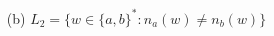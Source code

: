 \documentclass[12pt]{article}
\begin{document}
\begin{spacing}{1.5}
\begin{enumerate}
\begin{enumerate}
                        \item[(b)] $L_2=\{w \in \{a,b \}^* : n_a(w) \not= n_b(w) \}$

                  \end{enumerate}

      \end{enumerate}

\end{spacing}
\end{document}
